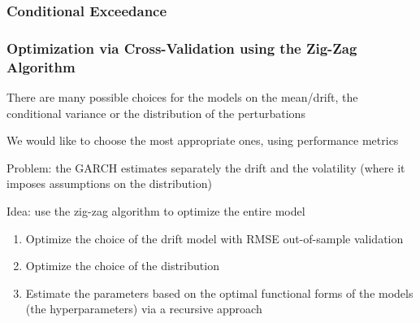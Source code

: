 \documentclass{beamer}
\newenvironment{wideitemize}{\itemize\addtolength{\itemsep}{10pt}}{\enditemize}
\begin{document}
\begin{frame}
  \frametitle{Conditional Exceedance}
\end{frame}


\begin{frame}
  \frametitle{Optimization via Cross-Validation using the Zig-Zag Algorithm}
  \begin{wideitemize}
    \item There are many possible choices for the models on the mean/drift, the conditional variance or the distribution of the perturbations
    \item We would like to choose the most appropriate ones, using performance metrics
    \item Problem: the GARCH estimates separately the drift and the volatility (where it imposes assumptions on the distribution)
    \item Idea: use the zig-zag algorithm to optimize the entire model
      \begin{enumerate}
      \item Optimize the choice of the drift model with RMSE out-of-sample validation 
      \item Optimize the choice of the distribution
      \item Estimate the parameters based on the optimal functional forms of the models (the hyperparameters) via a recursive approach
      \end{enumerate}      
  \end{wideitemize}  
\end{frame}
\end{document}
